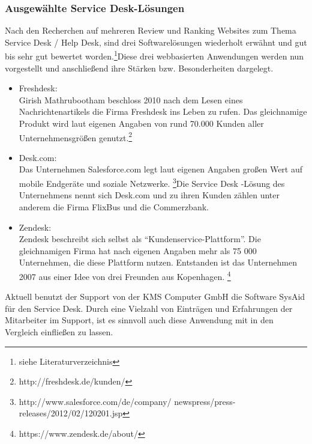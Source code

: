 


\subsubsection{Ausgewählte Service Desk-Lösungen}

\noindent
Nach den Recherchen auf mehreren Review und Ranking Websites zum Thema Service Desk / Help Desk, sind drei Softwarelösungen wiederholt erwähnt und gut bis sehr gut bewertet worden.\footnote{siehe Literaturverzeichnis}Diese drei webbasierten Anwendungen werden nun vorgestellt und anschließend ihre Stärken bzw. Besonderheiten dargelegt.

\begin{itemize}
\item Freshdesk:\\
		Girish Mathrubootham beschloss 2010 nach dem Lesen eines Nachrichtenartikels die Firma 
		Freshdesk ins Leben zu rufen. Das gleichnamige Produkt wird laut eigenen Angaben von rund 
		70.000 Kunden aller Unternehmensgrößen genutzt.\footnote{http://freshdesk.de/kunden/}
		\\
		 
\item Desk.com:\\
		Das Unternehmen Salesforce.com legt laut eigenen Angaben großen Wert auf mobile 
		Endgeräte und soziale Netzwerke. \footnote{http://www.salesforce.com/de/company/
		newspress/press-releases/2012/02/120201.jsp}Die Service Desk -Lösung des Unternehmens  
		nennt sich 	Desk.com und zu ihren Kunden zählen unter anderem die Firma FlixBus und die 
		Commerzbank.
		\\
		
\item Zendesk:\\
		Zendesk beschreibt sich selbst als \enquote{Kundenservice-Plattform}. Die gleichnamigen 
		Firma hat nach eigenen Angaben mehr als 75 000 Unternehmen, die diese Plattform nutzen. 
		Entstanden ist das Unternehmen 2007 aus einer Idee von drei Freunden aus Kopenhagen.
		\footnote{https://www.zendesk.de/about/}
		\\		
\end{itemize}

\noindent
Aktuell benutzt der Support von der KMS Computer GmbH die Software SysAid für den Service Desk. Durch eine Vielzahl von Einträgen und Erfahrungen der Mitarbeiter im Support, ist es sinnvoll auch diese Anwendung mit in den Vergleich einfließen zu lassen.

